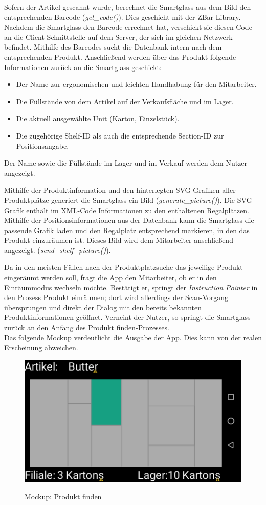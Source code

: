 Sofern der Artikel gescannt wurde, berechnet die Smartglass aus dem Bild den entsprechenden Barcode (\emph{get\_code()}). Dies geschieht mit der ZBar Library. Nachdem die Smartglass den Barcode errechnet hat, verschickt sie diesen Code an die Client-Schnittstelle auf dem Server, der sich im gleichen Netzwerk befindet. Mithilfe des Barcodes sucht die Datenbank intern nach dem entsprechenden Produkt. Anschließend werden über das Produkt folgende Informationen zurück an die Smartglass geschickt:
\begin{itemize}
	\item Der Name zur ergonomischen und leichten Handhabung für den Mitarbeiter.
	\item Die Füllstände von dem Artikel auf der Verkaufsfläche und im  Lager.
	\item Die aktuell ausgewählte Unit (Karton, Einzelstück).
	\item Die zugehörige Shelf-ID als auch die entsprechende Section-ID zur Positionsangabe.
\end{itemize}
Der Name sowie die Füllstände im Lager und im Verkauf werden dem Nutzer angezeigt.

Mithilfe der Produktinformation und den hinterlegten \acs{SVG}-Grafiken aller Produktplätze generiert die Smartglass ein Bild (\emph{generate\_picture()}). Die \acs{SVG}-Grafik enthält im \acs{XML}-Code Informationen zu den enthaltenen Regalplätzen. Mithilfe der Positionsinformationen aus der Datenbank kann die Smartglass die passende Grafik laden und den Regalplatz entsprechend markieren, in den das Produkt einzuräumen ist. Dieses Bild wird dem Mitarbeiter anschließend angezeigt. (\emph{send\_shelf\_picture()}).

Da in den meisten Fällen nach der Produktplatzsuche das jeweilige Produkt eingeräumt werden soll, fragt die App den Mitarbeiter, ob er in den Einräummodus wechseln möchte.
Bestätigt er, springt der \textit{Instruction Pointer} in den Prozess \glqq Produkt einräumen\grqq ; dort wird allerdings der Scan-Vorgang übersprungen und direkt der Dialog mit den bereits bekannten Produktinformationen geöffnet. Verneint der Nutzer, so springt die Smartglass zurück an den Anfang des \glqq Produkt finden\grqq -Prozesses. \\

Das folgende Mockup verdeutlicht die Ausgabe der App. Dies kann von der realen Erscheinung abweichen. 
\begin{figure}[H]
	\centering
	{\includegraphics[scale=0.7]{Bilder/Abbildungen/produkt_finden_mockup.png}}
	\caption{Mockup: Produkt finden}
	\label{fig:jwt_encode}
\end{figure}

